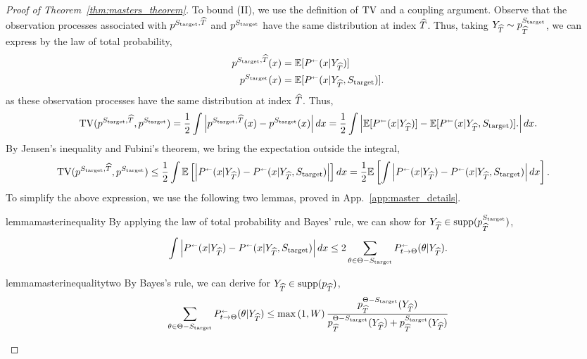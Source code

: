 \begin{proof}[Proof of Theorem~\ref{thm:masters_theorem}]
To bound (II), we use the definition of $\mathrm{TV}$ and a coupling argument. Observe that the observation processes associated with $p^{S_{\mathrm{target}},\widehat{T}}$ and $p^{S_{\mathrm{target}}}$ have the same distribution at index $\widehat{T}$. Thus, taking $Y_{\widehat{T}} \sim p^{S_{\mathrm{target}}}_{\widehat{T}}$, we can express by the law of total probability,
\begin{align*}
\modrevlawX{\Send}{\wh{T}}(x)&=\E[\kernelreverse[](x| Y_{\wh{T}})]\\
p^{\Send}(x)&=\E[\kernelreverse[](x| Y_{\wh{T}},\Send)].
\end{align*}
as these observation processes have the same distribution at index $\widehat{T}$. Thus, 
\begin{align*}
\TV(\modrevlawX{\Send}{\wh{T}},p^{\Send}) = \frac{1}{2}  \int \left|\modrevlawX{\Send}{\wh{T}}(x)-p^{\Send}(x) \right|dx=\frac{1}{2} \int \left| \E[\kernelreverse[](x| Y_{\wh{T}})] -\E[\kernelreverse[](x| Y_{\wh{T}},\Send)]. \right|dx.
\end{align*}
By Jensen's inequality and Fubini's theorem, we bring the expectation outside the integral, 
\begin{align*}
\TV(\modrevlawX{\Send}{\wh{T}},p^{\Send}) &\leq \frac{1}{2} \int \E\left[\left|\kernelreverse[](x| Y_{\wh{T}})-\kernelreverse[](x| Y_{\wh{T}},\Send)\right|\right] dx=\frac{1}{2}\E\left[\int \left|\kernelreverse[](x| Y_{\wh{T}})-\kernelreverse[](x| Y_{\wh{T}},\Send)\right| dx\right].
\end{align*}
To simplify the above expression, we use the following two lemmas, proved in App.~\ref{app:master_details}.
\begin{restatable}{lemma}{masterinequality}\label{lem:master_inequality}
By applying the law of total probability and Bayes' rule, we can show for $Y_{\widehat{T}}\in\mathrm{supp}(p^{S_{\mathrm{target}}}_{\widehat{T}})$,
\begin{align*}
\int \left|\kernelreverse[](x| Y_{\wh{T}})-\kernelreverse[](x| Y_{\wh{T}},\Send)\right| dx \leq  2 \sum_{\theta \in \Theta-\Send} \kernelreverse[]_{t \to \Theta}(\theta|Y_{\wh{T}}).
\end{align*}
\end{restatable} 
\begin{restatable}{lemma}{masterinequalitytwo}\label{lem:master_inequalitytwo}
By Bayes's rule, we can derive for $Y_{\widehat{T}} \in \mathrm{supp}(p_{\widehat{T}})$,
\begin{align*}
 \sum_{\theta \in \Theta-\Send} \kernelreverse[]_{t \to \Theta}(\theta|Y_{\wh{T}}) \leq  \max\left(1,W\right)  \frac{p^{\Theta-\Send}_{\wh{T}}(Y_{\wh{T}})}{ p^{\Theta-\Send}_{\wh{T}}(Y_{\wh{T}})+p^{\Send}_{\wh{T}}(Y_{\wh{T}})}

\end{align*}
\end{restatable}
\end{proof}
